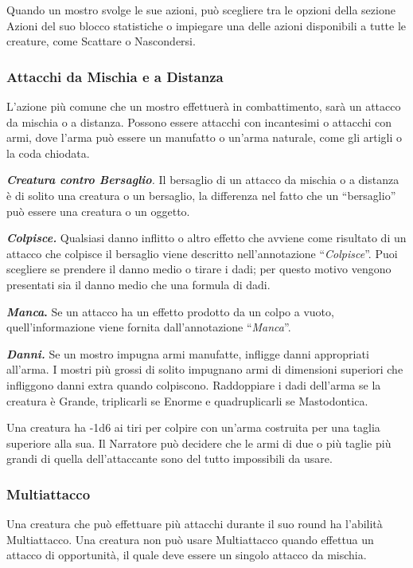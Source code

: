 \begin{multicols}{2}
Quando un mostro svolge le sue azioni, può scegliere tra le opzioni della sezione Azioni del suo blocco statistiche o impiegare una delle azioni disponibili a tutte le creature, come Scattare o Nascondersi.

\subsubsection{Attacchi da Mischia e a Distanza}

L'azione più comune che un mostro effettuerà in combattimento, sarà un attacco da mischia o a distanza. Possono essere attacchi con incantesimi o attacchi con armi, dove l'arma può essere un manufatto o un'arma naturale, come gli artigli o la coda chiodata.

\emph{\textbf{Creatura contro Bersaglio}.} Il bersaglio di un attacco da mischia o a distanza è di solito una creatura o un bersaglio, la differenza nel fatto che un ``bersaglio'' può essere una creatura o un oggetto.

\emph{\textbf{Colpisce.}} Qualsiasi danno inflitto o altro effetto che avviene come risultato di un attacco che colpisce il bersaglio viene descritto nell'annotazione ``\emph{Colpisce}''. Puoi scegliere se prendere il danno medio o tirare i dadi; per questo  motivo vengono presentati sia il danno medio che una formula di dadi. 

\textbf{\emph{Manca}.} Se un attacco ha un effetto prodotto da un colpo a vuoto, quell'informazione viene fornita dall'annotazione ``\emph{Manca}''.

\emph{\textbf{Danni.}} Se un mostro impugna armi manufatte, infligge danni appropriati all'arma. I mostri più grossi di solito impugnano armi di dimensioni superiori che infliggono danni extra quando colpiscono. Raddoppiare i dadi dell'arma se la creatura è Grande, triplicarli se Enorme e quadruplicarli se Mastodontica.

Una creatura ha -1d6 ai tiri per colpire con un'arma costruita per una taglia superiore alla sua.  Il Narratore può decidere che le armi di due o più taglie più grandi di quella dell'attaccante sono del tutto impossibili da usare.

\subsubsection{Multiattacco}

Una creatura che può effettuare più attacchi durante il suo round ha l'abilità Multiattacco. Una creatura non può usare Multiattacco quando effettua un attacco di opportunità, il quale deve essere un singolo attacco da mischia.


\end{multicols}
